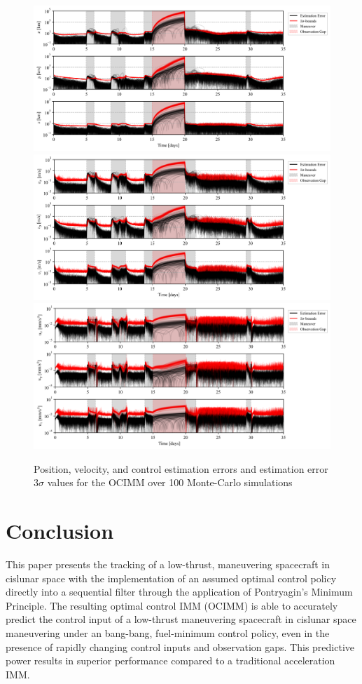 \documentclass[letterpaper, preprint, paper,11pt]{AAS}	%
\begin{document}
\begin{figure}
    \centering
    \includegraphics[width=0.9\linewidth]{Figures/position_3sigmas.png}
    \includegraphics[width=0.9\linewidth]{Figures/velocity_3sigmas.png}
    \includegraphics[width=0.9\linewidth]{Figures/control_3sigmas.png}
    \caption{Position, velocity, and control estimation errors and estimation error $3\sigma$ values for the OCIMM over 100 Monte-Carlo simulations}
    \label{fig:three-sigmas}
\end{figure}

\section{Conclusion}

This paper presents the tracking of a low-thrust, maneuvering spacecraft in cislunar space with the implementation of an assumed optimal control policy directly into a sequential filter through the application of Pontryagin's Minimum Principle. The resulting optimal control IMM (OCIMM) is able to accurately predict the control input of a low-thrust maneuvering spacecraft in cislunar space maneuvering under an bang-bang, fuel-minimum control policy, even in the presence of rapidly changing control inputs and observation gaps. This predictive power results in superior performance compared to a traditional acceleration IMM. 
\end{document}

